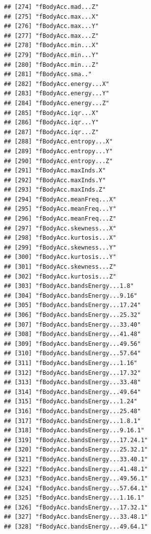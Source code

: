 \documentclass[
]{article}
\begin{document}
\begin{verbatim}
## [274] "fBodyAcc.mad...Z"                    
## [275] "fBodyAcc.max...X"                    
## [276] "fBodyAcc.max...Y"                    
## [277] "fBodyAcc.max...Z"                    
## [278] "fBodyAcc.min...X"                    
## [279] "fBodyAcc.min...Y"                    
## [280] "fBodyAcc.min...Z"                    
## [281] "fBodyAcc.sma.."                      
## [282] "fBodyAcc.energy...X"                 
## [283] "fBodyAcc.energy...Y"                 
## [284] "fBodyAcc.energy...Z"                 
## [285] "fBodyAcc.iqr...X"                    
## [286] "fBodyAcc.iqr...Y"                    
## [287] "fBodyAcc.iqr...Z"                    
## [288] "fBodyAcc.entropy...X"                
## [289] "fBodyAcc.entropy...Y"                
## [290] "fBodyAcc.entropy...Z"                
## [291] "fBodyAcc.maxInds.X"                  
## [292] "fBodyAcc.maxInds.Y"                  
## [293] "fBodyAcc.maxInds.Z"                  
## [294] "fBodyAcc.meanFreq...X"               
## [295] "fBodyAcc.meanFreq...Y"               
## [296] "fBodyAcc.meanFreq...Z"               
## [297] "fBodyAcc.skewness...X"               
## [298] "fBodyAcc.kurtosis...X"               
## [299] "fBodyAcc.skewness...Y"               
## [300] "fBodyAcc.kurtosis...Y"               
## [301] "fBodyAcc.skewness...Z"               
## [302] "fBodyAcc.kurtosis...Z"               
## [303] "fBodyAcc.bandsEnergy...1.8"          
## [304] "fBodyAcc.bandsEnergy...9.16"         
## [305] "fBodyAcc.bandsEnergy...17.24"        
## [306] "fBodyAcc.bandsEnergy...25.32"        
## [307] "fBodyAcc.bandsEnergy...33.40"        
## [308] "fBodyAcc.bandsEnergy...41.48"        
## [309] "fBodyAcc.bandsEnergy...49.56"        
## [310] "fBodyAcc.bandsEnergy...57.64"        
## [311] "fBodyAcc.bandsEnergy...1.16"         
## [312] "fBodyAcc.bandsEnergy...17.32"        
## [313] "fBodyAcc.bandsEnergy...33.48"        
## [314] "fBodyAcc.bandsEnergy...49.64"        
## [315] "fBodyAcc.bandsEnergy...1.24"         
## [316] "fBodyAcc.bandsEnergy...25.48"        
## [317] "fBodyAcc.bandsEnergy...1.8.1"        
## [318] "fBodyAcc.bandsEnergy...9.16.1"       
## [319] "fBodyAcc.bandsEnergy...17.24.1"      
## [320] "fBodyAcc.bandsEnergy...25.32.1"      
## [321] "fBodyAcc.bandsEnergy...33.40.1"      
## [322] "fBodyAcc.bandsEnergy...41.48.1"      
## [323] "fBodyAcc.bandsEnergy...49.56.1"      
## [324] "fBodyAcc.bandsEnergy...57.64.1"      
## [325] "fBodyAcc.bandsEnergy...1.16.1"       
## [326] "fBodyAcc.bandsEnergy...17.32.1"      
## [327] "fBodyAcc.bandsEnergy...33.48.1"      
## [328] "fBodyAcc.bandsEnergy...49.64.1"      

\end{verbatim}
\end{document}
